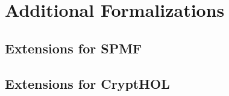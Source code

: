 \chapter{Additional Formalizations}

\section{Extensions for SPMF}

\section{Extensions for CryptHOL}
